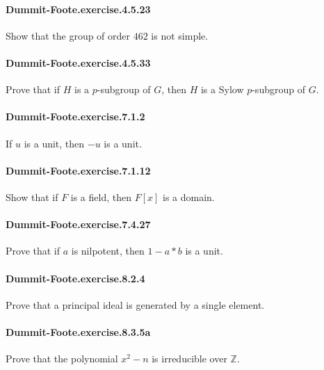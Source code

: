 \documentclass{article}
\begin{document}
\paragraph{Dummit-Foote.exercise.4.5.23} Show that the group of order $462$ is not simple.

\paragraph{Dummit-Foote.exercise.4.5.33} Prove that if $H$ is a $p$-subgroup of $G$, then $H$ is a Sylow $p$-subgroup of $G$.

\paragraph{Dummit-Foote.exercise.7.1.2} If $u$ is a unit, then $-u$ is a unit.

\paragraph{Dummit-Foote.exercise.7.1.12} Show that if $F$ is a field, then $F[x]$ is a domain.



\paragraph{Dummit-Foote.exercise.7.4.27} Prove that if $a$ is nilpotent, then $1-a*b$ is a unit.

\paragraph{Dummit-Foote.exercise.8.2.4} Prove that a principal ideal is generated by a single element.

\paragraph{Dummit-Foote.exercise.8.3.5a} Prove that the polynomial $x^2 - n$ is irreducible over $\mathbb{Z}$.
\end{document}
